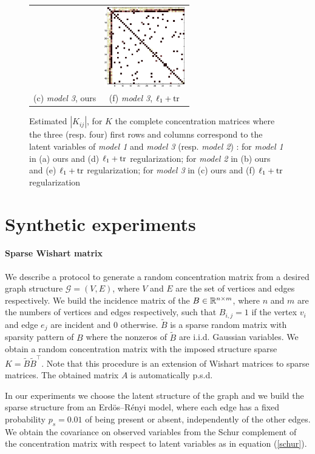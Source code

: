 \begin{figure}
\begin{tabular}{cc}
  &   \includegraphics[width=3.5cm]{fig/diff_tr}
   \\    (c)  \textit{model 3}, ours & (f)  \textit{model 3}, $\ell_1+{\rm tr}$  \\[6pt]
\end{tabular}
\caption{Estimated $|K_{ij}|$, for $K$ the complete concentration matrices where the three (resp. four) first rows and columns correspond to the latent variables of \textit{model 1} and \textit{model 3} (resp. \textit{model 2}) : for \textit{model 1} in (a) ours and (d) $\ell_1+{\rm tr}$ regularization; for \textit{model 2} in (b) ours and (e) $\ell_1+{\rm tr}$ regularization; for \textit{model 3} in (c) ours and (f) $\ell_1+{\rm tr}$ regularization }
\end{figure}

\section{Synthetic experiments }

\paragraph{Sparse Wishart matrix}
We describe a protocol to generate a random concentration matrix from a desired graph structure $\mathcal{G}=(V,E)$, where $V$ and $E$ are the set of vertices and edges respectively. We build the incidence matrix of the $B\in\mathbb{R}^{n\times m}$, where $n$ and $m$ are the numbers of vertices and edges respectively, such that $B_{i,j} = 1$ if the vertex $v_i$ and edge $e_j$ are incident and $0$ otherwise. $\tilde{B}$ is a sparse random matrix with sparsity pattern of $B$ where the nonzeros of $\tilde{B}$ are i.i.d. Gaussian variables. We obtain a random concentration matrix with the imposed structure sparse $K=\tilde{B}\tilde{B}^{\top}$. Note that this procedure is an extension of Wishart matrices to sparse matrices. The obtained matrix $A$ is automatically p.s.d.

In our experiments we choose the latent structure of the graph and we build the sparse structure from an Erd\"os–R\'enyi model, where each edge has a fixed probability $p_{s}=0.01$ of being present or absent, independently of the other edges. We obtain the covariance on observed variables from the Schur complement of the concentration matrix with respect to latent variables as in equation (\ref{schur}).\\

